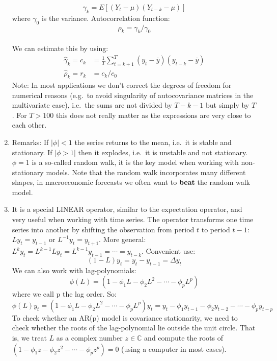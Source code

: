 \begin{enumerate}
\[\gamma_k = E[(Y_t - \mu)(Y_{t-k}-\mu)]\]
where \(\gamma_0\) is the variance. Autocorrelation function: \[\rho_k = \gamma_k/\gamma_0\]
\\
We can estimate this by using:
\begin{align*}
\hat{\gamma}_k = c_k &= \frac{1}{T} \sum_{t=k+1}^T(y_t -\bar{y})(y_{t-k}-\bar{y})
\\
\hat{\rho}_k = r_k & = c_k/c_0
\end{align*}
Note: In most applications we don't correct the degrees of freedom for numerical reasons
  (e.g.\ to avoid singularity of autocovariance matrices in the multivariate case),
  i.e.\ the sums are not divided by \(T-k-1\) but simply by \(T\).
For \(T>100\) this does not really matter as the expressions are very close to each other.

\item 
Remarks: If \(|\phi|<1\) the series returns to the mean, i.e.\ it is stable and stationary.
If \(|\phi>1|\) then it explodes, i.e.\ it is unstable and not stationary.
\(\phi=1\) is a so-called random walk,
  it is the key model when working with non-stationary models.
Note that the random walk incorporates many different shapes, in macroeconomic forecasts we often want to \textbf{beat} the random walk model.
\item It is a special LINEAR operator, similar to the expectation operator, and very useful when working with time series.
The operator transforms one time series into another by shifting the observation from period \(t\) to period \(t-1\):
\(Ly_t = y_{t-1}\) or \(L^{-1} y_t =y_{t+1}\).
More general: \(L^k y_t = L^{k-1} L y_t = L^{k-1} y_{t-1} = \cdots  = y_{t-k}\).
Convenient use:
\[(1-L)y_t = y_t - y_{t-1}= \Delta y_t\]
We can also work with lag-polynomials:
\[ \phi(L) = (1-\phi_1 L-\phi_2 L^2 -\cdots  - \phi_p L^p)\]
where we call p the lag order. So:
\[ \phi(L) y_t = (1-\phi_1 L-\phi_2 L^2 -\cdots  - \phi_p L^p)y_t = y_t - \phi_1 y_{t-1} -\phi_2 y_{t-2} - \cdots  - \phi_p y_{t-p}\]
To check whether an {AR{(p)}} model is covariance stationarity, we need to check whether the roots of the lag-polynomial lie outside the unit circle.
That is, we treat \(L\) as a complex number \(z\in \mathbb{C}\) and compute the roots of \((1-\phi_1 z-\phi_2 z^2 -\cdots  - \phi_p z^p)=0\) (using a computer in most cases).
\end{enumerate}